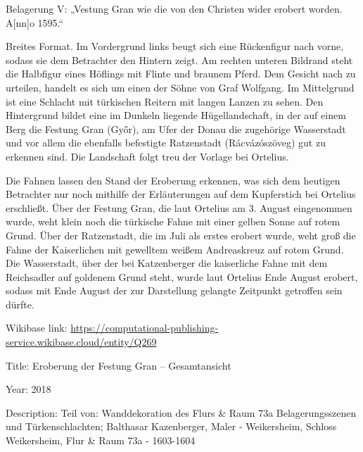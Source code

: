 \documentclass[
  a4paper,
  portrait]{book}
\begin{document}
Belagerung V: „Vestung Gran wie die von den Christen wider erobert
worden. A{[}nn{]}o 1595.``

Breites Format. Im Vordergrund links beugt sich eine Rückenfigur nach
vorne, sodass sie dem Betrachter den Hintern zeigt. Am rechten unteren
Bildrand steht die Halbfigur eines Höflings mit Flinte und braunem
Pferd. Dem Gesicht nach zu urteilen, handelt es sich um einen der Söhne
von Graf Wolfgang. Im Mittelgrund ist eine Schlacht mit türkischen
Reitern mit langen Lanzen zu sehen. Den Hintergrund bildet eine im
Dunkeln liegende Hügellandschaft, in der auf einem Berg die Festung Gran
(Győr), am Ufer der Donau die zugehörige Wasserstadt und vor allem die
ebenfalls befestigte Ratzenstadt (Rácvázószöveg) gut zu erkennen sind.
Die Landschaft folgt treu der Vorlage bei Ortelius.

Die Fahnen lassen den Stand der Eroberung erkennen, was sich dem
heutigen Betrachter nur noch mithilfe der Erläuterungen auf dem
Kupferstich bei Ortelius erschließt. Über der Festung Gran, die laut
Ortelius am 3. August eingenommen wurde, weht klein noch die türkische
Fahne mit einer gelben Sonne auf rotem Grund. Über der Ratzenstadt, die
im Juli als erstes erobert wurde, weht groß die Fahne der Kaiserlichen
mit gewelltem weißem Andreaskreuz auf rotem Grund. Die Wasserstadt, über
der bei Katzenberger die kaiserliche Fahne mit dem Reichsadler auf
goldenem Grund steht, wurde laut Ortelius Ende August erobert, sodass
mit Ende August der zur Darstellung gelangte Zeitpunkt getroffen sein
dürfte.

Wikibase link:
\url{https://computational-publishing-service.wikibase.cloud/entity/Q269}

Title: Eroberung der Festung Gran -- Gesamtansicht

Year: 2018

Description: Teil von: Wanddekoration des Flurs \& Raum 73a
Belagerungsszenen und Türkenschlachten; Balthasar Kazenberger, Maler -
Weikersheim, Schloss Weikersheim, Flur \& Raum 73a - 1603-1604
\end{document}
